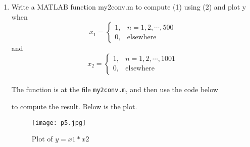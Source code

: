 \documentclass[12pt, a4paper]{article}
\begin{document}
\begin{enumerate}
  \item Write a MATLAB function my2conv.m to compute (1) using (2) and plot y when
    \[ x_1 = \begin{cases}
        1, & n = 1, 2, \cdots, 500 \\
        0, & \text{elsewhere}
    \end{cases} \] and
    \[ x_2 = \begin{cases}
        1, & n = 1, 2, \cdots, 1001 \\
        0, & \text{elsewhere}
    \end{cases} \]
    \\[12pt]
    The function is at the file \texttt{my2conv.m}, and then use the code below
    
    to compute the result. Below is the plot.
    \begin{center}
    \begin{figure}[H]
      \centering
      \texttt{[image: p5.jpg]}
      \caption{Plot of $y = x1 * x2$}
    \end{figure}
  \end{center}
\end{enumerate}
\end{document}
